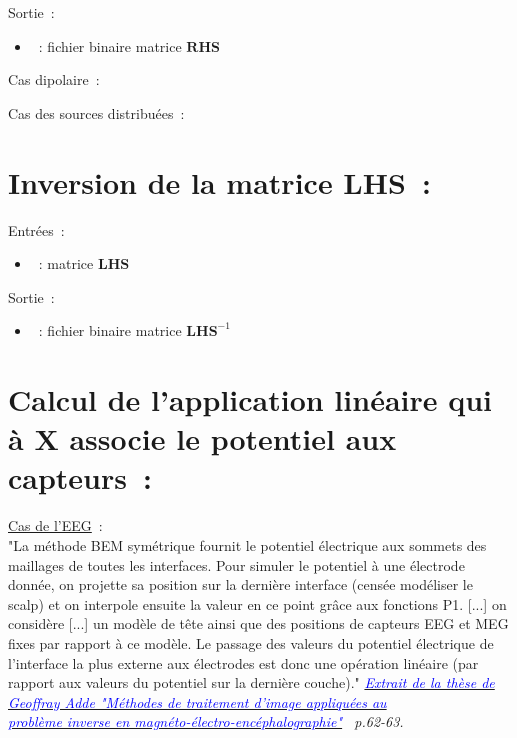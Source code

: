 \noindent
Sortie~:
\begin{itemize}
    \item {}~: fichier binaire matrice $\mathbf{RHS}$
\end{itemize}

\medskip

\noindent
Cas dipolaire~:\\
\noindent
{}

\medskip

\noindent
Cas des sources distribuées~:\\
\noindent
{}

\section{Inversion de la matrice $\mathbf{LHS}$~:}
\label{sect: command invert lhs}

\noindent
Entrées~:
\begin{itemize}
    \item {}~: matrice $\mathbf{LHS}$
\end{itemize}

\noindent
Sortie~:
\begin{itemize}
    \item {}~: fichier binaire matrice $\mathbf{LHS}^{-1}$
\end{itemize}

\medskip

\noindent
{}

\section{Calcul de l'application linéaire qui à X associe le potentiel aux capteurs~:}
\label{sect: command assemble sensors}

\checkItem \underline{Cas de l'EEG}~:\\
"La méthode BEM symétrique fournit le potentiel électrique aux sommets des maillages de toutes les interfaces. Pour simuler le
potentiel à une électrode donnée, on projette sa position sur la dernière interface (censée modéliser le scalp) et on interpole
ensuite la valeur en ce point grâce aux fonctions P1.  [...] on considère [...] un modèle de tête ainsi que des positions de
capteurs EEG et MEG fixes par rapport à ce modèle. Le passage des valeurs du potentiel électrique de l'interface la plus externe
aux électrodes est donc une opération linéaire (par rapport aux valeurs du potentiel sur la dernière couche)."
\emph{\underline{\textcolor{blue}{Extrait de la thèse de Geoffray Adde "Méthodes de traitement d'image appliquées au}}}\\
\emph{\underline{\textcolor{blue}{problème inverse en magnéto-électro-encéphalographie"}}  p.62-63.}

